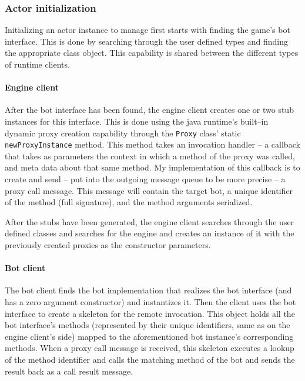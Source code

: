 \documentclass[11pt,a4paper,oneside]{report}
\newcommand{\code}{\texttt}
\begin{document}
		\subsubsection*{Actor initialization}
		
		Initializing an actor instance to manage first starts with finding the game's bot interface. This is done by searching through the user defined types and finding the appropriate class object. This capability is shared between the different types of runtime clients.
		
			\paragraph{Engine client}
		
			After the bot interface has been found, the engine client creates one or two stub instances for this interface. This is done using the java runtime's built--in dynamic proxy creation capability through the \code{Proxy} class' static \code{newProxyInstance} method. This method takes an invocation handler -- a callback that takes as parameters the context in which a method of the proxy was called, and meta data about that same method. My implementation of this callback is to create and send -- put into the outgoing message queue to be more precise -- a proxy call message. This message will contain the target bot, a unique identifier of the method (full signature), and the method arguments serialized.
			
			After the stubs have been generated, the engine client searches through the user defined classes and searches for the engine and creates an instance of it with the previously created proxies as the constructor parameters.
			
			\paragraph{Bot client}
			
			The bot client finds the bot implementation that realizes the bot interface (and has a zero argument constructor) and instantizes it. Then the client uses the bot interface to create a skeleton for the remote invocation. This object holds all the bot interface's methods (represented by their unique identifiers, same as on the engine client's side) mapped to the aforementioned bot instance's corresponding methods. When a proxy call message is received, this skeleton executes a lookup of the method identifier and calls the matching method of the bot and sends the result back as a call result message. 
			
\end{document}
